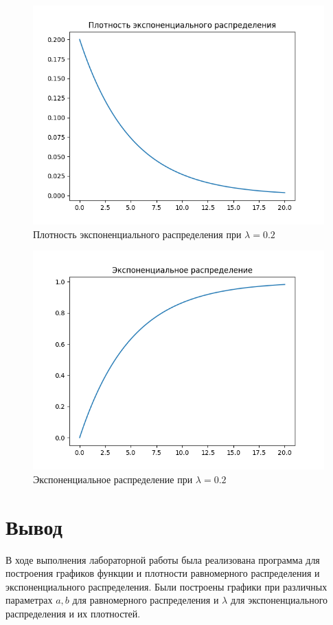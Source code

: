 \documentclass[a4paper, 14pt]{article}
\begin{document}
\begin{figure}[H]
    \includegraphics[scale=0.8]{02_exponential_density.png}
    \caption{Плотность экспоненциального распределения при $\lambda=0.2$}
\end{figure}

\begin{figure}[H]
    \includegraphics[scale=0.8]{02_exponential.png}
    \caption{Экспоненциальное распределение при $\lambda=0.2$}
\end{figure}

\section*{Вывод}
В ходе выполнения лабораторной работы была реализована программа для построения графиков функции и плотности равномерного распределения и экспоненциального распределения. Были построены графики при различных параметрах $a, b$ для равномерного распределения и $\lambda$ для экспоненциального распределения и их плотностей.
\end{document}
